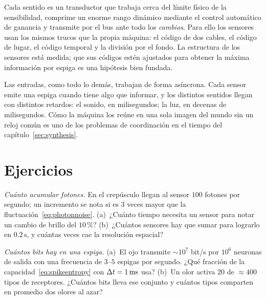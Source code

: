 \begin{keyblock}
\begin{proposition}
\label{prop:sensors}
Cada sentido es un transductor que trabaja cerca del límite físico de la sensibilidad, comprime un enorme rango dinámico mediante el control automático de ganancia y transmite por el bus  ante todo los \emph{cambios}. Para ello los sensores usan los mismos trucos que la propia máquina: el código de dos cables, el código de lugar, el código temporal y la división por el fondo. La estructura de los sensores está medida; que sus códigos estén ajustados para obtener la máxima información por espiga es una hipótesis bien fundada.
\end{proposition}
\end{keyblock}

Las entradas, como todo lo demás, trabajan de forma asíncrona. Cada sensor emite una espiga cuando tiene algo que informar, y los distintos sentidos llegan con distintos retardos: el sonido, en milisegundos; la luz, en decenas de milisegundos. Cómo la máquina los reúne en una sola imagen del mundo sin un reloj común es uno de los problemas de coordinación en el tiempo del capítulo~\ref{sec:synthesis}.

\section{Ejercicios}

\begin{exercise}[\lvlA]
\label{ex:11:1}
\emph{Cuánto acumular fotones.} En el crepúsculo llegan al sensor $100$ fotones por segundo; un incremento se nota si es $3$ veces mayor que la fluctuación~\eqref{eq:photonnoise}. (a)~¿Cuánto tiempo necesita un sensor para notar un cambio de brillo del $10\,\%$? (b)~¿Cuántos sensores hay que sumar para lograrlo en $0.2\,\text{s}$, y cuántas veces cae la resolución espacial?
\end{exercise}

\begin{exercise}[\lvlA]
\label{ex:11:2}
\emph{Cuántos bits hay en una espiga.} (a)~El ojo transmite $\sim10^7$ bit/s por $10^6$ neuronas de salida con una frecuencia de $3$--$5$ espigas por segundo. ¿Qué fracción de la capacidad~\eqref{eq:spikeentropy} con $\Delta t=1\,\text{ms}$ usa? (b)~Un olor activa $20$ de $\approx400$ tipos de receptores. ¿Cuántos bits lleva ese conjunto y cuántos tipos comparten en promedio dos olores al azar?
\end{exercise}

